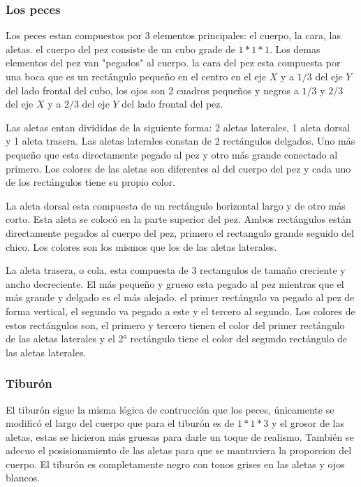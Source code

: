 \documentclass[10pt, a4paper, twocolumn]{article}
\begin{document}
\subsubsection{Los peces}
Los peces estan compuestos por 3 elementos principales: el cuerpo, la cara, las aletas. el cuerpo del pez consiste de un cubo grade de $1*1*1$. Los demas elementos del pez van "pegados" al cuerpo. la cara del pez esta compuesta por una boca que es un rectángulo pequeño en el centro en el eje $X$ y a $1/3$ del eje $Y$ del lado frontal del cubo, los ojos son 2 cuadros pequeños y negros a $1/3$ y $2/3$ del eje $X$ y a $2/3$ del eje $Y$ del lado frontal del pez. 

Las aletas entan divididas de la siguiente forma: 2 aletas laterales, 1 aleta dorsal y 1 aleta trasera. Las aletas laterales constan de 2 rectángulos delgados. Uno más pequeño que esta directamente pegado al pez y otro más grande conectado al primero. Los colores de las aletas son diferentes al del cuerpo del pez y cada uno de los rectángulos tiene su propio color.

La aleta dorsal esta compuesta de un rectángulo horizontal largo y de otro más corto. Esta aleta se colocó en la parte superior del pez. Ambos rectángulos están directamente pegados al cuerpo del pez, primero el rectangulo grande seguido del chico. Los colores son los mismos que los de las aletas laterales. 

La aleta trasera, o cola, esta compuesta de 3 rectangulos de tamaño creciente y ancho decreciente. El más pequeño y grueso esta pegado al pez mientras que el más grande y delgado es el más alejado. el primer rectángulo va pegado al pez de forma vertical, el segundo va pegado a este y el tercero al segundo. Los colores de estos rectángulos son, el primero y tercero tienen el color del primer rectángulo de las aletas laterales y el 2° rectángulo tiene el color del segundo rectángulo de las aletas laterales.

\subsubsection{Tiburón}
El tiburón sigue la misma lógica de contrucción que los peces, únicamente se modificó el largo del cuerpo que para el tiburón es de $1*1*3$ y el grosor de las aletas, estas se hicieron más gruesas para darle un toque de realismo. También se adecuo el posisionamiento de las aletas para que se mantuviera la proporcion del cuerpo. El tiburón es completamente negro con tonos grises en las aletas y ojos blancos.
\end{document}
